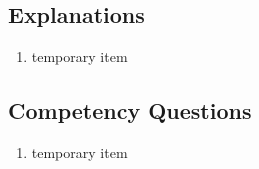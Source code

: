 \subsection{Explanations}
\label{exp:sosa}
\begin{enumerate}
\item temporary item
\end{enumerate}

\subsection{Competency Questions}
\label{cqs:sosa}
\begin{enumerate}[CQ1.]
\item temporary item
\end{enumerate}

\newpage
